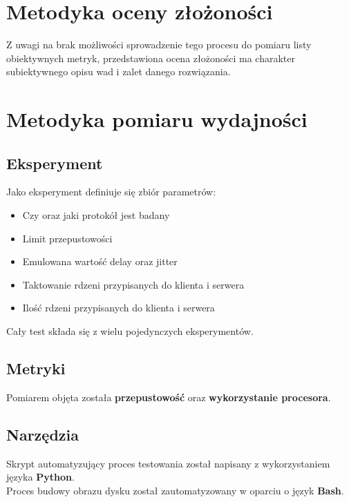\section{Metodyka oceny złożoności}

Z uwagi na brak możliwości sprowadzenie tego procesu do pomiaru listy obiektywnych metryk, przedstawiona ocena złożoności ma charakter subiektywnego opisu wad i zalet danego rozwiązania.

\section{Metodyka pomiaru wydajności}

\subsection{Eksperyment}

Jako eksperyment definiuje się zbiór parametrów:

\begin{itemize}[leftmargin=*]
    \item Czy oraz jaki protokół jest badany
    \item Limit przepustowości
    \item Emulowana wartość delay oraz jitter
    \item Taktowanie rdzeni przypisanych do klienta i serwera
    \item Ilość rdzeni przypisanych do klienta i serwera
\end{itemize}

Cały test składa się z wielu pojedynczych eksperymentów.

\subsection{Metryki}

Pomiarem objęta została \textbf{przepustowość} oraz \textbf{wykorzystanie procesora}.

\subsection{Narzędzia}

Skrypt automatyzujący proces testowania został napisany z wykorzystaniem języka \textbf{Python}.\\

Proces budowy obrazu dysku został zautomatyzowany w oparciu o język \textbf{Bash}.\\

